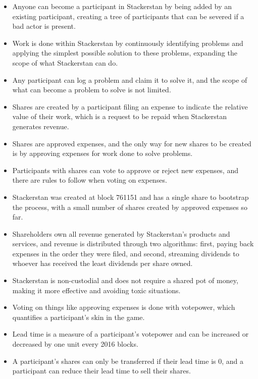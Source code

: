 \begin{itemize}
\item Anyone can become a participant in Stackerstan by being added by an existing participant, creating a tree of participants that can be severed if a bad actor is present.
\item Work is done within Stackerstan by continuously identifying problems and applying the simplest possible solution to these problems, expanding the scope of what Stackerstan can do.
\item Any participant can log a problem and claim it to solve it, and the scope of what can become a problem to solve is not limited.
\item Shares are created by a participant filing an expense to indicate the relative value of their work, which is a request to be repaid when Stackerstan generates revenue.
\item Shares are approved expenses, and the only way for new shares to be created is by approving expenses for work done to solve problems.
\item Participants with shares can vote to approve or reject new expenses, and there are rules to follow when voting on expenses.
\item Stackerstan was created at block 761151 and has a single share to bootstrap the process, with a small number of shares created by approved expenses so far.
\item Shareholders own all revenue generated by Stackerstan's products and services, and revenue is distributed through two algorithms: first, paying back expenses in the order they were filed, and second, streaming dividends to whoever has received the least dividends per share owned.
\item Stackerstan is non-custodial and does not require a shared pot of money, making it more effective and avoiding toxic situations.
\item Voting on things like approving expenses is done with votepower, which quantifies a participant's skin in the game.
\item Lead time is a measure of a participant's votepower and can be increased or decreased by one unit every 2016 blocks.
\item A participant's shares can only be transferred if their lead time is 0, and a participant can reduce their lead time to sell their shares.
\end{itemize}
